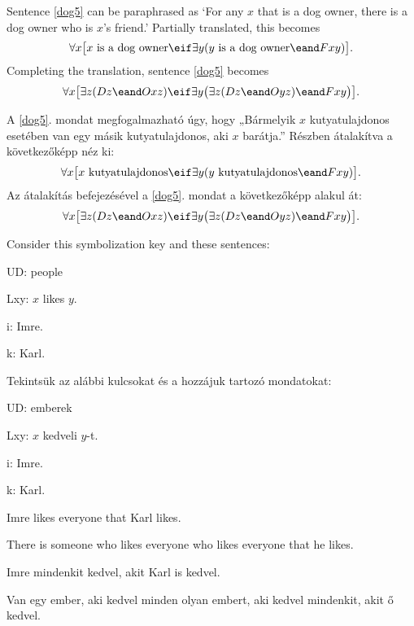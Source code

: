 Sentence \ref{dog5} can be paraphrased as `For any $x$ that is a dog owner, there is a dog owner who is $x$'s friend.' Partially translated, this becomes $$\forall x\bigl[\mbox{$x$ is a dog owner}\eif\exists y(\mbox{$y$ is a dog owner}\eand Fxy)\bigr].$$ Completing the translation, sentence \ref{dog5} becomes $$\forall x\bigl[\exists z(Dz \eand Oxz)\eif\exists y\bigl(\exists z(Dz \eand Oyz)\eand Fxy\bigr)\bigr].$$

A \ref{dog5}. mondat megfogalmazható úgy, hogy „Bármelyik $x$ kutyatulajdonos esetében van egy másik kutyatulajdonos, aki $x$ barátja.” Részben átalakítva a következőképp néz ki: $$\forall x\bigl[\mbox{$x$ kutyatulajdonos}\eif\exists y(\mbox{$y$ kutyatulajdonos}\eand Fxy)\bigr].$$ Az átalakítás befejezésével a \ref{dog5}. mondat a következőképp alakul át: $$\forall x\bigl[\exists z(Dz \eand Oxz)\eif\exists y\bigl(\exists z(Dz \eand Oyz)\eand Fxy\bigr)\bigr].$$

Consider this symbolization key and these sentences:
\begin{ekey}
\item[UD:] people
\item[Lxy:] $x$ likes $y$.
\item[i:] Imre.
\item[k:] Karl.
\end{ekey}

Tekintsük az alábbi kulcsokat és a hozzájuk tartozó mondatokat:
\begin{ekey}
\item[UD:] emberek
\item[Lxy:] $x$ kedveli $y$-t.
\item[i:] Imre.
\item[k:] Karl.
\end{ekey}

\begin{earg}
\item[\ex{likes1}]Imre likes everyone that Karl likes.
\item[\ex{likes2}]There is someone who likes everyone who likes everyone that he likes.
\end{earg}

\begin{earg}
\item[\ex{likes1}]Imre mindenkit kedvel, akit Karl is kedvel.
\item[\ex{likes2}]Van egy ember, aki kedvel minden olyan embert, aki kedvel mindenkit, akit ő kedvel.
\end{earg}


